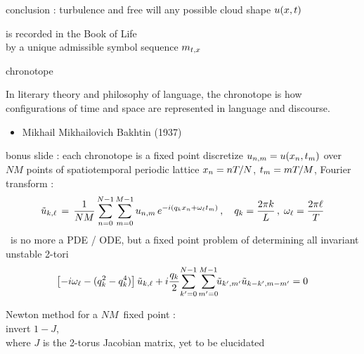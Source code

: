 \begin{frame}{conclusion : turbulence and free will}
any possible cloud shape $u(x,t)$

\vfill
is recorded in the Book of Life
\\
 by a unique admissible symbol sequence $m_{t,x}$
\end{frame}

\begin{frame}{chronotope
}
\begin{bartlett}{
In literary theory and philosophy of language, the chronotope is how
configurations of time and space are represented in language and
discourse.
                }
\end{bartlett}

\bigskip
\bigskip

\begin{itemize}
  \item Mikhail Mikhailovich Bakhtin (1937)
\end{itemize}
\end{frame}

%

\begin{frame}{bonus slide : each chronotope is a fixed point}
discretize $u_{n,m} = u(x_n,t_m)$ over
$N M$ points of spatiotemporal periodic lattice $x_n = n {T_{}}/N$,
 $t_m = m {T_{}}/M$, Fourier transform :
%
\[
\tilde{u}_{k,\ell} \,=\,
  \frac{1}{NM} \sum^{N-1}_{n=0} \sum^{M-1}_{m=0}
  u_{n,m} \, e^{-i(q_kx_n + \omega_\ell t_m)}
    \,,\quad
q_k = \frac{2 \pi k}{L}
    \,,\;
\omega_\ell = \frac{2 \pi \ell}{{T_{}}}
\]
\KS\ is no more a PDE / ODE, but a fixed point problem of
determining all invariant unstable 2-tori
\[
\left[- i \omega_\ell - ( q_k^2 - q_k^4 ) \right]\tilde{u}_{k,\ell}
+ i \frac{q_k}{2} \!\sum_{k'=0}^{N-1} \sum^{M-1}_{m'=0}\!\!
\tilde{u}_{k',m'} \tilde{u}_{k-k',m-m'}
    =
0
\]

\bigskip

Newton method for a $NM$\dmn\ fixed point :
\\ invert $1-J$,
\\ where $J$ is the
2-torus Jacobian matrix, yet to be elucidated
\end{frame}

